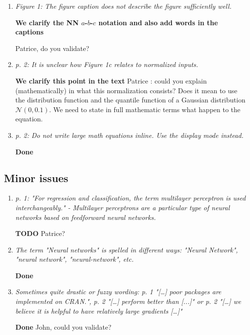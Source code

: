 \documentclass[12pt]{article}
\newcommand{\red}[1]{{\color{red}#1}}
\begin{document}
\begin{enumerate}[resume]
\item \textit{Figure 1: The figure caption does not describe the figure sufficiently well.}

\textbf{We clarify the NN $a$-$b$-$c$ notation and also add words in the captions}

\red{Patrice, do you validate?}

\item \textit{p. 2: It is unclear how Figure 1c relates to normalized inputs.}

\textbf{We clarify this point in the text}
\red{Patrice : could you explain (mathematically) in what this normalization consists? Does it mean to use the distribution
function and the quantile function of a Gaussian distribution $\mathcal N(0,0.1)$. We need to state in full mathematic
terms what happen to the equation.}

\item \textit{p. 2: Do not write large math equations inline. Use the display mode instead.}

\textbf{Done}

\end{enumerate}

\subsection*{Minor issues}

\begin{enumerate}[resume]
\item \textit{p. 1: "For regression and classification, the term multilayer perceptron is used interchangeably." - Multilayer perceptrons are a particular type of neural networks based on feedforward neural networks.}

\textbf{TODO}
\red{Patrice?}

\item \textit{The term "Neural networks" is spelled in different ways: "Neural Network", "neural network", "neural-network", etc.}

\textbf{Done}

 
\item \textit{Sometimes quite drastic or fuzzy wording: p. 1 "[…] poor packages are implemented on CRAN.", p. 2 "[…] perform better than [...]" or p. 2 "[…] we believe it is helpful to have relatively large gradients […]"}

\textbf{Done}
\red{John, could you validate?}

\end{enumerate}
\end{document}
